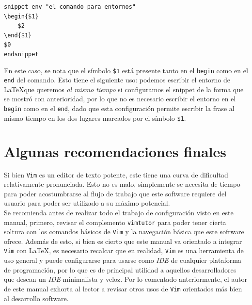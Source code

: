 \documentclass[10pt]{article}
\begin{document}
\begin{verbatim}
snippet env "el comando para entornos"
\begin{$1}
	$2
\end{$1}
$0
endsnippet
\end{verbatim}
En este caso, se nota que el símbolo \texttt{\$1} está presente tanto en el \texttt{begin} como en el \texttt{end} del comando. Esto tiene el siguiente uso: podemos escribir el entorno de \LaTeX que queremos \textit{al mismo tiempo} si configuramos el snippet de la forma que se mostró con anterioridad, por lo que no es necesario escribir el entorno en el \texttt{begin} como en el \texttt{end}, dado que esta configuración permite escribir la frase al mismo tiempo en los dos lugares marcados por el símbolo \texttt{\$1}.
\section{Algunas recomendaciones finales}
Si bien \texttt{Vim} es un editor de texto potente, este tiene una curva de dificultad relativamente pronunciada. Esto no es malo, simplemente se necesita de tiempo para poder acostumbrarse al flujo de trabajo que este software requiere del usuario para poder ser utilizado a su máximo potencial. \\
Se recomienda antes de realizar todo el trabajo de configuración visto en este manual, primero, revisar el complemento \texttt{vimtutor} para poder tener cierta soltura con los comandos básicos de \texttt{Vim} y la navegación básica que este software ofrece. Además de esto, si bien es cierto que este manual va orientado a integrar \texttt{Vim} con \LaTeX, es necesario recalcar que en realidad, \texttt{Vim} es una herramienta de uso general y puede configurarse para usarse como \textit{IDE} de cualquier plataforma de programación, por lo que es de principal utilidad a aquellos desarrolladores que desean un \textit{IDE} minimalista y veloz. Por lo comentado anteriormente, el autor de este manual exhorta al lector a revisar otros usos de \texttt{Vim} orientados más bien al desarrollo software. 
\end{document}
